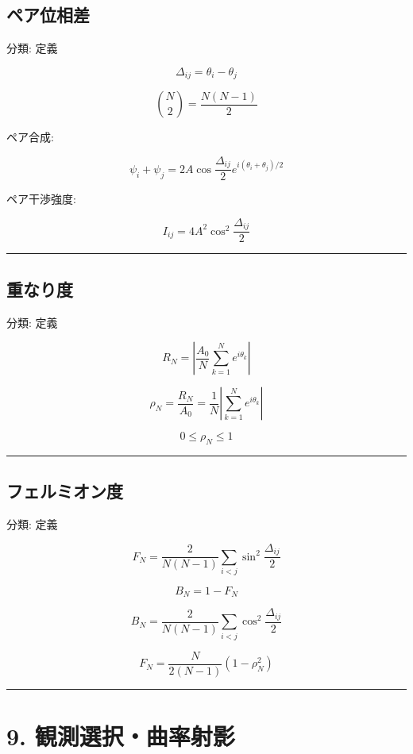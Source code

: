 \documentclass[
  a4paper,
]{ltjsarticle}
\begin{document}
\subsection{ペア位相差}\label{ux30daux30a2ux4f4dux76f8ux5dee}

分類: 定義

\[
\Delta_{ij}=\theta_i-\theta_j
\]

\[
\binom{N}{2}=\frac{N(N-1)}{2}
\]

ペア合成:

\[
\psi_i+\psi_j
=2A\cos\frac{\Delta_{ij}}{2}e^{i(\theta_i+\theta_j)/2}
\]

ペア干渉強度:

\[
I_{ij}=4A^2\cos^2\frac{\Delta_{ij}}{2}
\]

\begin{center}\rule{0.5\linewidth}{0.5pt}\end{center}

\subsection{重なり度}\label{ux91cdux306aux308aux5ea6}

分類: 定義

\[
R_N=\left|\frac{A_0}{N}\sum_{k=1}^{N}e^{i\theta_k}\right|
\]

\[
\rho_N=\frac{R_N}{A_0}
=\frac{1}{N}\left|\sum_{k=1}^{N}e^{i\theta_k}\right|
\]

\[
0\le\rho_N\le1
\]

\begin{center}\rule{0.5\linewidth}{0.5pt}\end{center}

\subsection{フェルミオン度}\label{ux30d5ux30a7ux30ebux30dfux30aaux30f3ux5ea6}

分類: 定義

\[
F_N=
\frac{2}{N(N-1)}
\sum_{i<j}\sin^2\frac{\Delta_{ij}}{2}
\]

\[
B_N=1-F_N
\]

\[
B_N=
\frac{2}{N(N-1)}
\sum_{i<j}\cos^2\frac{\Delta_{ij}}{2}
\]

\[
F_N=\frac{N}{2(N-1)}(1-\rho_N^2)
\]

\begin{center}\rule{0.5\linewidth}{0.5pt}\end{center}

\section{9.
観測選択・曲率射影}\label{ux89b3ux6e2cux9078ux629eux66f2ux7387ux5c04ux5f71}
\end{document}
